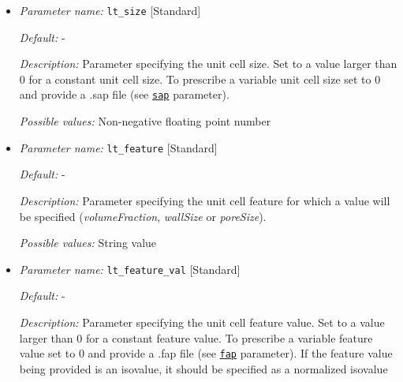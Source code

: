 \begin{itemize}[itemsep=0.8em, parsep=0.3em]
	
	{\it Default:} 0.25
	
	{\it Description:} Correction factor to compensate for the thinning effect of hybridization. Only active if {\tt lt\_type} is set to {\it hybrid}.
	
	{\it Possible values:} Non-negative floating point number
	
	\item {\it Parameter name:} {\tt lt\_size} \hfill [Standard]
	\label{parameters:lt_size}
	
	
	{\it Default:} -
	
	{\it Description:} Parameter specifying the unit cell size. Set to a value larger than 0 for a constant unit cell size. To prescribe a variable unit cell size set to 0 and provide a .sap file (see \hyperref[parameters:sap]{\tt sap} parameter).
	
	{\it Possible values:} Non-negative floating point number
	
	\item {\it Parameter name:} {\tt lt\_feature} \hfill [Standard]
	\label{parameters:lt_feature}
	
	
	{\it Default:} -
	
	{\it Description:} Parameter specifying the unit cell feature for which a value will be specified ({\it volumeFraction}, {\it wallSize} or {\it poreSize}).
	
	{\it Possible values:} String value
	
	\item {\it Parameter name:} {\tt lt\_feature\_val} \hfill [Standard]
	\label{parameters:lt_feature_val}
	
	
	{\it Default:} -
	
	{\it Description:} Parameter specifying the unit cell feature value. Set to a value larger than 0 for a constant feature value. To prescribe a variable feature value set to 0 and provide a .fap file (see \hyperref[parameters:fap]{\tt fap} parameter). If the feature value being provided is an isovalue, it should be specified as a normalized isovalue
	

\end{itemize}
